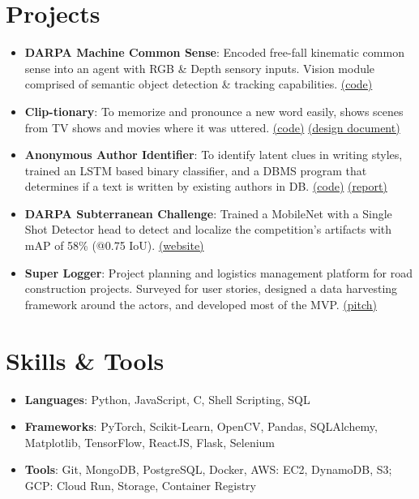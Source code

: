 \documentclass[letterpaper,11pt]{article}
\newcommand{\resumeItem}[2]{
  \item\small{
    \textbf{#1}{: #2 \vspace{-2pt}}
  }
}
\newcommand{\resumeSubItem}[2]{\resumeItem{#1}{#2}\vspace{-4pt}}
\newcommand{\resumeSubHeadingListStart}{\begin{itemize}[leftmargin=*]}
\newcommand{\resumeSubHeadingListEnd}{\end{itemize}}
\begin{document}
\section{Projects}
  \resumeSubHeadingListStart
    \resumeSubItem{DARPA Machine Common Sense}
      {Encoded free-fall kinematic common sense into an agent with RGB \& Depth sensory inputs. Vision module comprised of semantic object detection \& tracking capabilities. \textcolor{MidnightBlue}{\href{https://github.com/MCS-OSU/mcs_eval3/tree/component/gravity.dspr}{(code)}}}
    \resumeSubItem{Clip-tionary}
      {To memorize and pronounce a new word easily, shows scenes from TV shows and movies where it was uttered. \textcolor{MidnightBlue}{\href{https://github.com/RahulDamineni/tv-dict}{(code)} \href{https://github.com/RahulDamineni/tv-dict/blob/master/CS562_ProjectSketch.pdf}{(design document)}}}
    \resumeSubItem{Anonymous Author Identifier}
      {To identify latent clues in writing styles, trained an LSTM based binary classifier, and a DBMS program that determines if a text is written by existing authors in DB. \textcolor{MidnightBlue}{\href{https://github.com/RahulDamineni/anonymous_author_matcher}{(code)} \href{https://github.com/RahulDamineni/anonymous_author_matcher/blob/master/anon_author_identifier_report.pdf}{(report)}}}
    \resumeSubItem{DARPA Subterranean Challenge}
      {Trained a MobileNet with a Single Shot Detector head to detect and localize the competition's artifacts with mAP of 58\% (@0.75 IoU). \textcolor{MidnightBlue}{\href{https://www.subt-explorer.com/}{(website)}}}
    \resumeSubItem{Super Logger}
      {Project planning and logistics management platform for road construction projects. Surveyed for user stories, designed a data harvesting framework around the actors, and developed most of the MVP. \textcolor{MidnightBlue}{\href{https://drive.google.com/file/d/1H9IJ4kVDP79thjI6kPTr0LBxHkd46nlo/view?usp=sharing}{(pitch)}}}
  \resumeSubHeadingListEnd


\vspace{-5pt}
\section{Skills \& Tools}
  \resumeSubHeadingListStart
    \item{
      \textbf{Languages}{: Python, JavaScript, C, Shell Scripting, SQL}
    }
    \item{
      \textbf{Frameworks}{: PyTorch, Scikit-Learn, OpenCV, Pandas, SQLAlchemy, Matplotlib, TensorFlow, ReactJS, Flask, Selenium}
    }
    \item{
      \textbf{Tools}{: Git, MongoDB, PostgreSQL, Docker, AWS: EC2, DynamoDB, S3; GCP: Cloud Run, Storage, Container Registry}
    }
  \resumeSubHeadingListEnd
\end{document}
